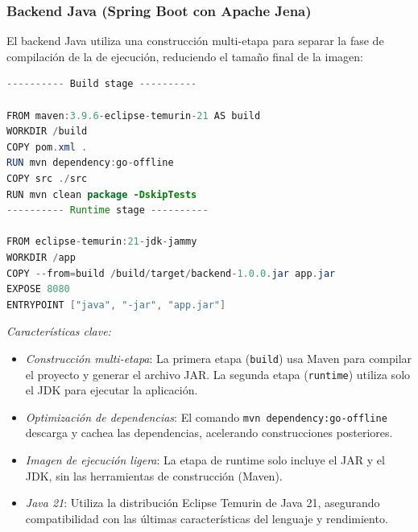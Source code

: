 \documentclass{article}
\begin{document}
\subsubsection{Backend Java (Spring Boot con Apache Jena)}
El backend Java utiliza una construcción multi-etapa para separar la fase de compilación de la de ejecución, reduciendo el tamaño final de la imagen:
\begin{lstlisting}[language=java, basicstyle=\small\ttfamily]
---------- Build stage ----------

FROM maven:3.9.6-eclipse-temurin-21 AS build
WORKDIR /build
COPY pom.xml .
RUN mvn dependency:go-offline
COPY src ./src
RUN mvn clean package -DskipTests
---------- Runtime stage ----------

FROM eclipse-temurin:21-jdk-jammy
WORKDIR /app
COPY --from=build /build/target/backend-1.0.0.jar app.jar
EXPOSE 8080
ENTRYPOINT ["java", "-jar", "app.jar"]
\end{lstlisting}
\textit{Características clave:}
\begin{itemize}
\item \textit{Construcción multi-etapa}: La primera etapa (\texttt{build}) usa Maven para compilar el proyecto y generar el archivo JAR. La segunda etapa (\texttt{runtime}) utiliza solo el JDK para ejecutar la aplicación.
\item \textit{Optimización de dependencias}: El comando \texttt{mvn dependency:go-offline} descarga y cachea las dependencias, acelerando construcciones posteriores.
\item \textit{Imagen de ejecución ligera}: La etapa de runtime solo incluye el JAR y el JDK, sin las herramientas de construcción (Maven).
\item \textit{Java 21}: Utiliza la distribución Eclipse Temurin de Java 21, asegurando compatibilidad con las últimas características del lenguaje y rendimiento.
\end{itemize}
\end{document}
